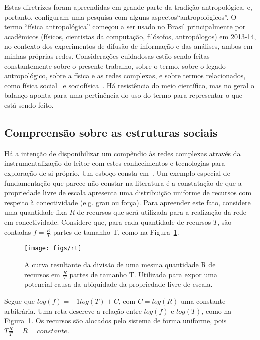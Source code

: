 \documentclass[a4paper,openright,12pt]{report} %
\begin{document}
Estas diretrizes foram apreendidas em grande parte da tradição antropológica,
e, portanto, configuram uma pesquisa com alguns aspectos``antropológicos''.
O termo ``física antropológica'' começou a ser usado no Brasil principalmente por
acadêmicos (físicos, cientistas da computação, filósofos, antropólogos) em 2013-14,
no contexto dos experimentos de difusão de informação e das análises, ambos em minhas próprias redes.
Considerações cuidadosas estão sendo feitas constantemente sobre o presente trabalho, 
sobre o termo, sobre o legado antropológico,
sobre a física e as redes complexas, e sobre termos relacionados, 
como física social~\cite{pentland2} e sociofísica~\cite{socioF}.
Há resistência do meio científico, mas no geral o balanço aponta para uma pertinência do uso do termo
para representar o que está sendo feito.

\subsection{Compreensão sobre as estruturas sociais}\label{sec:com}
Há a intenção de disponibilizar um compêndio às redes complexas
através da instrumentalização do leitor com estes conhecimentos e tecnologias
para exploração de si próprio. Um esboço
consta em~\cite{gradus}.
Um exemplo especial de fundamentação que parece não 
constar na literatura é a constatação de que
a propriedade livre de escala apresenta uma distribuição
uniforme de recursos com respeito à conectividade (e.g. grau ou força).
Para apreender este fato, considere uma quantidade fixa $R$ de recursos
que será utilizada para a realização da rede em conectividade.
Considere que, para cada quantidade de recursos $T$, são contadas $f=\frac{R}{T}$ partes de tamanho T, como na Figura~\ref{fig:1T}.

\begin{figure}[!h]
    \centering
    \caption{ \footnotesize A curva resultante da divisão de uma mesma quantidade
    R de recursos em $\frac{R}{T}$ partes de tamanho T.
        Utilizada para expor uma potencial causa da ubiquidade da
        propriedade livre de escala.}
    \texttt{[image: figs/rt]}
    \label{fig:1T}
\end{figure}

Segue que $log(f)=-1 log(T) + C$, com $C=log(R)$ uma constante
arbitrária. Uma reta descreve a relação entre $log(f)$ e 
$log(T)$, como na Figura~\ref{fig:1T}.
Os recursos são alocados pelo sistema de forma uniforme,
pois $T\frac{R}{T}=R=constante$.
\end{document}
